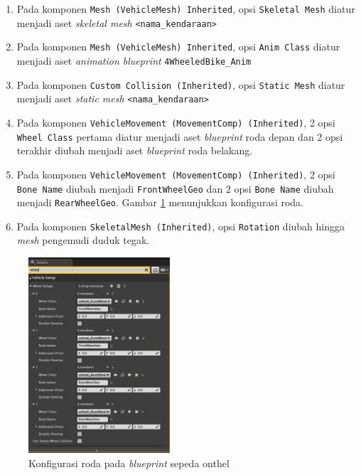 \begin{enumerate}
    \item Pada komponen \verb|Mesh (VehicleMesh) Inherited|, opsi \verb|Skeletal Mesh|
    diatur menjadi aset \textit{skeletal mesh} \verb|<nama_kendaraan>|
    \item Pada komponen \verb|Mesh (VehicleMesh) Inherited|, opsi \verb|Anim Class|
    diatur menjadi aset \textit{animation blueprint} \verb|4WheeledBike_Anim|
    \item Pada komponen \verb|Custom Collision (Inherited)|, opsi \verb|Static Mesh|
    diatur menjadi aset \textit{static mesh} \verb|<nama_kendaraan>|
    \item Pada komponen \verb|VehicleMovement (MovementComp) (Inherited)|, 2
    opsi \verb|Wheel Class| pertama diatur menjadi aset \textit{blueprint} roda
    depan dan 2 opsi terakhir diubah menjadi aset \textit{blueprint} roda
    belakang.
    \item Pada komponen \verb|VehicleMovement (MovementComp) (Inherited)|, 2
    opsi \verb|Bone Name| diubah menjadi \verb|FrontWheelGeo| dan 2 opsi
    \verb|Bone Name| diubah menjadi \verb|RearWheelGeo|. Gambar
    \ref{fig:onthel-blueprint-wheels} menunjukkan konfigurasi roda.
    \item Pada komponen \verb|SkeletalMesh (Inherited)|, opsi \verb|Rotation|
    diubah hingga \textit{mesh} pengemudi duduk tegak.
\end{enumerate}

\begin{figure}[!h]
    \centering
    \includegraphics[width=0.47\textwidth]{resources/chapter-4/onthel-blueprint-wheels.png}
    \caption{Konfigurasi roda pada \textit{blueprint} sepeda onthel}
    \label{fig:onthel-blueprint-wheels}
\end{figure}


